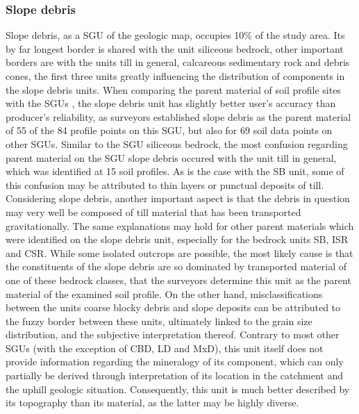 \documentclass[preprint,12pt,authoryear]{elsarticle}
\begin{document}
\subsubsection{Slope debris}
Slope debris, as a SGU of the geologic map, occupies 10\% of the study area. Its by far longest border is shared with the unit siliceous bedrock, other important borders are with the units till in general, calcareous sedimentary rock and debris cones, the first three units greatly influencing the distribution of components in the slope debris units. When comparing the parent material of soil profile sites with the SGUs , the slope debris unit has slightly better user's accuracy than producer's reliability, as surveyors established slope debris as the parent material of 55 of the 84 profile points on this SGU, but also for 69 soil data points on other SGUs. Similar to the SGU siliceous bedrock, the most confusion regarding parent material on the SGU slope debris occured with the unit till in general, which was identified at 15 soil profiles. As is the case with the SB unit, some of this confusion may be attributed to thin layers or punctual deposits of till. Considering slope debris, another important aspect is that the debris in question may very well be composed of till material that has been transported gravitationally. The same explanations may hold for other parent materials which were identified on the slope debris unit, especially for the bedrock units SB, ISR and  CSR. While some isolated outcrops are possible, the most likely cause is that the constituents of the slope debris are so dominated by transported material of one of these bedrock classes, that the surveyors determine this unit as the parent material of the examined soil profile. On the other hand, misclassifications between the units coarse blocky debris and slope deposits can be attributed to the fuzzy border between these units, ultimately linked to the grain size distribution, and the subjective interpretation thereof. 
Contrary to most other SGUs (with the exception of CBD, LD and MxD), this unit itself does not provide information regarding the mineralogy of its component, which can only partially be derived through  interpretation  of its location in the catchment and the uphill geologic situation. Consequently, this unit  is much better described by its topography than its material, as the latter may be highly diverse.
\end{document}
